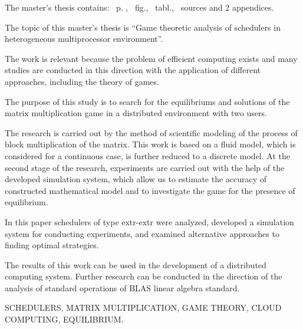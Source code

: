 
The master's thesis contains: \pageref*{MyLastPage}~p. , \totfig~fig., \tottab~tabl., ~sources and 2 appendices.

The topic of this master's thesis is ``Game theoretic analysis of schedulers in heterogeneous multiprocessor environment''.

The work is relevant because the problem of efficient computing exists and many studies are conducted in this direction with the application of different approaches, including the theory of games.

The purpose of this study is to search for the equilibriums and solutions of the matrix multiplication game in a distributed environment with two users. 

The research is carried out by the method of scientific modeling of the process of block multiplication of the matrix. This work is based on a fluid model, which is considered for a continuous case, is further reduced to a discrete model. At the second stage of the research, experiments are carried out with the help of the developed simulation system, which allow us to estimate the accuracy of constructed mathematical model and to investigate the game for the presence of equilibrium.

In this paper schedulers of type extr-extr were analyzed, developed a simulation system for conducting experiments, and examined alternative approaches to finding optimal strategies.

The results of this work can be used in the development of a distributed computing system. Further research can be conducted in the direction of the analysis of standard operations of BLAS linear algebra standard.

\MakeUppercase{schedulers, matrix multiplication, game theory, cloud computing, equilibrium.} 